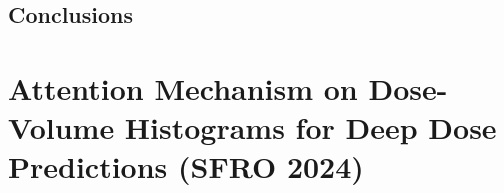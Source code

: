\subsection{Conclusions}


\section{Attention Mechanism on Dose-Volume Histograms for Deep Dose Predictions (SFRO 2024)}
